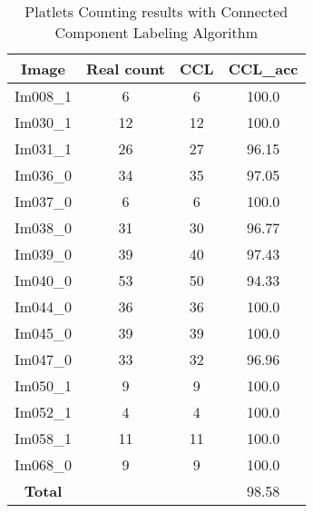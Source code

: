 \begin{table}[H]
\centering
\begin{tabular}{|  c | c | c | c |}
\hline
\textbf{Image} & \textbf{Real count} & \textbf{CCL} & \textbf{CCL\_acc} \\
\hline
Im008\_1 & 6 & 6  & 100.0 \\
Im030\_1 & 12 & 12  & 100.0 \\
Im031\_1 & 26 & 27  & 96.15 \\
Im036\_0 & 34 & 35  & 97.05 \\
Im037\_0 & 6 & 6  & 100.0 \\
Im038\_0 & 31 & 30  & 96.77 \\
Im039\_0 & 39 & 40  & 97.43 \\
Im040\_0 & 53 & 50  & 94.33 \\
Im044\_0 & 36 & 36  & 100.0 \\
Im045\_0 & 39 & 39  & 100.0 \\
Im047\_0 & 33 & 32  & 96.96 \\
Im050\_1 & 9 & 9  & 100.0 \\
Im052\_1 & 4 & 4  & 100.0 \\
Im058\_1 & 11 & 11  & 100.0 \\
Im068\_0 & 9 & 9  & 100.0 \\
\hline
\textbf{Total} &  &  & 98.58\\
\hline
\end{tabular}
\caption{Platlets Counting results with Connected Component Labeling Algorithm}
\label{table:PLT_UNET_RESULT}
\end{table}